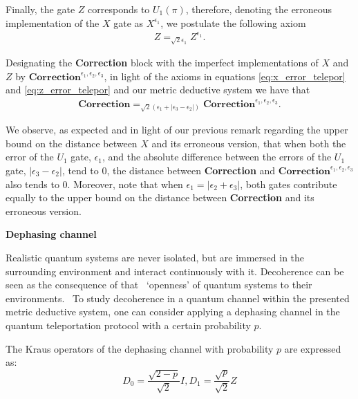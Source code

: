     Finally, the gate $Z$ corresponds to $U_1(\pi)$, therefore, denoting the erroneous implementation of the $X$ gate as $X^{\epsilon_1}$, we postulate the following axiom
    \begin{align} \label{eq:z_error_telepor}
      Z =_{\sqrt{2} \epsilon_1} Z^{\epsilon_1}.
    \end{align}

    Designating the \textbf{Correction} block with the imperfect implementations of $X$ and $Z$ by $\textbf{Correction}^{\epsilon_1, \epsilon_2, \epsilon_3}$, in light of the axioms in equations \eqref{eq:x_error_telepor} and \eqref{eq:z_error_telepor} and our metric deductive system we have that
    \begin{align} \label{eq:correction_error_telepor}
      \textbf{Correction} =_{\sqrt{2} \left(\epsilon_1 +|\epsilon_3-\epsilon_2| \right)} \textbf{Correction}^{\epsilon_1, \epsilon_2, \epsilon_3}.
    \end{align}


    We observe, as expected and in light of our previous remark regarding the upper bound on the distance between $X$ and its erroneous version, that when both the error of the $U_1$ gate, $\epsilon_1$, and the absolute difference between the errors of the $U_1$ gate, $|\epsilon_3 - \epsilon_2|$, tend to $0$, the distance between  \textbf{Correction}  and $\textbf{Correction}^{\epsilon_1, \epsilon_2, \epsilon_3}$ also tends to $0$. 
    Moreover, note that when $\epsilon_1 = |\epsilon_2 + \epsilon_3|$, both gates contribute equally to the upper bound on the distance between \textbf{Correction} and its erroneous version.

    \vspace{5pt}

     \textbf{Dephasing channel}

     Realistic quantum systems are never isolated, but are immersed in the surrounding environment and interact continuously with it. Decoherence can be seen as the consequence of that  `openness' of quantum systems to their environments.  To study decoherence in a quantum channel within the presented metric deductive system, one can consider applying a dephasing channel in the quantum teleportation protocol with a certain probability $p$.

     The Kraus operators of the dephasing channel with probability $p$ are expressed as:
     \begin{equation*}
          D_{0}= \frac{\sqrt{2-p}}{\sqrt{2}} I,  D_{1}= \frac{\sqrt{p}}{\sqrt{2}} Z
     \end{equation*}
     
